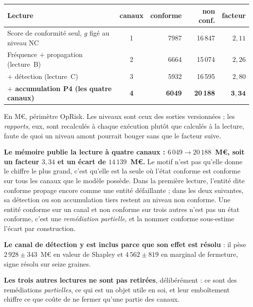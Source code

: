 \begin{center}\footnotesize
\renewcommand{\arraystretch}{1.25}
\begin{tabular}{@{}l c r r r@{}}
\toprule
\textbf{Lecture} & \textbf{canaux} & \textbf{conforme} & \textbf{non conf.} & \textbf{facteur} \\
\midrule
Score de conformité seul, $g$ figé au niveau NC & 1 & 7987 & 16\,847 & $2{,}11$ \\
Fréquence $+$ propagation (lecture~B) & 2 & 6664 & 15\,074 & $2{,}26$ \\
$+$ détection (lecture~C) & 3 & 5932 & 16\,595 & $2{,}80$ \\
\textbf{$+$ accumulation P4 (les quatre canaux)} & \textbf{4} & \textbf{6049} & \textbf{20\,188}
& $\mathbf{3{,}34}$ \\
\bottomrule
\end{tabular}
\end{center}

\vspace{4pt}
\noindent En M\euro, périmètre OpRisk. Les niveaux sont ceux des sorties versionnées ; les
\emph{rapports}, eux, sont recalculés à chaque exécution plutôt que
calculés à la lecture, faute de quoi un niveau amont pourrait bouger sans que le facteur suive.

\begin{cle}
\textbf{Le mémoire publie la lecture à quatre canaux : $6\,049 \to 20\,188$~M\euro, soit un
facteur $3{,}34$ et un écart de $14\,139$~M\euro.} Le motif n'est pas qu'elle donne le chiffre
le plus grand, c'est qu'elle est la seule où l'état conforme est conforme sur tous les
canaux que le modèle possède. Dans la première lecture, l'entité dite conforme propage encore
comme une entité défaillante ; dans les deux suivantes, sa détection ou son accumulation tiers
restent au niveau non conforme. Une entité conforme sur un canal et non conforme sur trois autres
n'est pas un état conforme, c'est une \emph{remédiation partielle}, et la nommer conforme
sous-estime l'écart par construction.

\textbf{Le canal de détection y est inclus parce que son effet est résolu} : il pèse
$2\,928 \pm 343$~M\euro{} en valeur de Shapley et
$4\,562 \pm 819$ en marginal de fermeture, signe résolu sur seize graines.

\textbf{Les trois autres lectures ne sont pas retirées}, délibérément : ce sont des
remédiations \emph{partielles}, ce qui est un objet utile en soi, et leur emboîtement chiffre ce
que coûte de ne fermer qu'une partie des canaux.
\end{cle}

